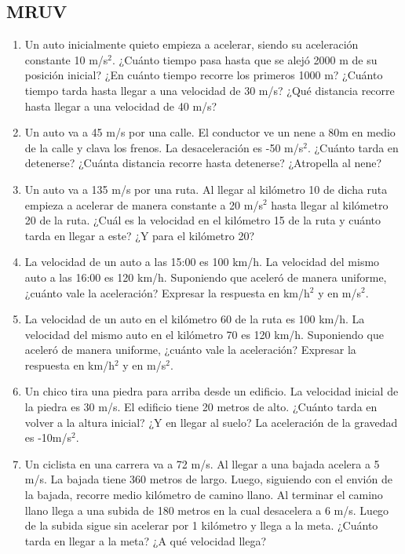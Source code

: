 \subsection{MRUV}
\begin{enumerate}
    \item Un auto inicialmente quieto empieza a acelerar, siendo su aceleración constante 10 m/s$^2$. ¿Cuánto tiempo pasa hasta que se alejó 2000 m de su posición inicial? ¿En cuánto tiempo recorre los primeros 1000 m? ¿Cuánto tiempo tarda hasta llegar a una velocidad de 30 m/s? ¿Qué distancia recorre hasta llegar a una velocidad de 40 m/s?
    
    \item Un auto va a 45 m/s por una calle. El conductor ve un nene a 80m en medio de la calle y clava los frenos. La desaceleración es -50 m/s$^2$. ¿Cuánto tarda en detenerse? ¿Cuánta distancia recorre hasta detenerse? ¿Atropella al nene? 
    
    \item Un auto va a 135 m/s por una ruta. Al llegar al kilómetro 10 de dicha ruta empieza a acelerar de manera constante a 20 m/s$^2$ hasta llegar al kilómetro 20 de la ruta. ¿Cuál es la velocidad en el kilómetro 15 de la ruta y cuánto tarda en llegar a este? ¿Y para el kilómetro 20? 
    
    \item La velocidad de un auto a las 15:00 es 100 km/h. La velocidad del mismo auto a las 16:00 es 120 km/h. Suponiendo que aceleró de manera uniforme, ¿cuánto vale la aceleración? Expresar la respuesta en km/h$^2$ y en m/s$^2$.

    \item La velocidad de un auto en el kilómetro 60 de la ruta es 100 km/h. La velocidad del mismo auto en el kilómetro 70 es 120 km/h. Suponiendo que aceleró de manera uniforme, ¿cuánto vale la aceleración? Expresar la respuesta en km/h$^2$ y en m/s$^2$. %

    \item Un chico tira una piedra para arriba desde un edificio. La velocidad inicial de la piedra es 30 m/s. El edificio tiene 20 metros de alto. ¿Cuánto tarda en volver a la altura inicial? ¿Y en llegar al suelo? La aceleración de la gravedad es -10m/s$^2$. %
    
    \item Un ciclista en una carrera va a 72 m/s. Al llegar a una bajada acelera a 5 m/s. La bajada tiene 360 metros de largo. Luego, siguiendo con el envión de la bajada, recorre medio kilómetro de camino llano. Al terminar el camino llano llega a una subida de 180 metros en la cual desacelera a 6 m/s. Luego de la subida sigue sin acelerar por 1 kilómetro y llega a la meta. ¿Cuánto tarda en llegar a la meta? ¿A qué velocidad llega?


\end{enumerate}
